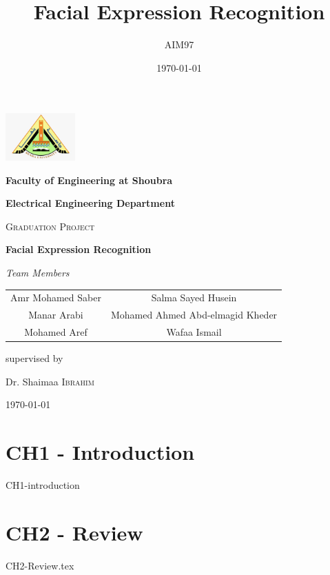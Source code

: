 \documentclass[a4paper]{book}
\title{Facial Expression Recognition}
\author{AIM97}
\date{\today}
\begin{document}
\begin{titlepage}
	\centering
	\includegraphics[width=0.2\textwidth]{images/benha.jpeg}
	\par\vspace{1cm}
	\textbf{Faculty of Engineering at Shoubra}\par 
	\vspace{0.5cm}
	\textbf{Electrical Engineering Department} \par
	\vspace{1cm}
	{\scshape\Large Graduation Project\par}
	\vspace{1.5cm}
	{\huge\bfseries Facial Expression Recognition\par}
	\vspace{2cm}
	{\Large\itshape Team Members\par}
	\vspace{1cm}
	{\renewcommand{\arraystretch}{2}
	\begin{tabular}[width=0.9\textwidth]{c  c}
		Amr Mohamed Saber & Salma Sayed Husein \\
		Manar Arabi & Mohamed Ahmed Abd-elmagid Kheder \\
		Mohamed Aref & Wafaa Ismail 
	\end{tabular}
	}
	
	\vfill
	supervised by\par
	Dr. Shaimaa \textsc{Ibrahim}
	
	\vfill
	
	{\large \today\par}
\end{titlepage}
	
	\maketitle
	\tableofcontents
	\chapter{CH1 - Introduction}
	{CH1-introduction}
	
	\chapter{CH2 - Review}
	{CH2-Review.tex}
	
\end{document}
